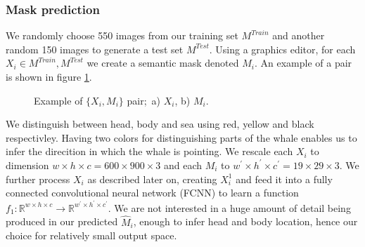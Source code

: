 \documentclass{IET}%
\newcommand{\real}{\mathbb{R}}
\begin{document}
\subsubsection{Mask prediction}

We randomly choose 550 images from our training set $M^{Train}$ and another random 150 images to generate a test set $M^{Test}$. Using a graphics editor, for each $X_i \in {M^{Train}, M^{Test}}$ we create a semantic mask denoted $M_i$. An example of a pair is shown in figure \ref{fig:whaleLabel}.
\begin{figure}[H]
\centering     %
{}
\caption{Example of $\{X_i,M_i\}$ pair;\
a) $X_i$, b) $M_i$.
}\label{fig:whaleLabel}
\end{figure}
We distinguish between head, body and sea using red, yellow and black respectivley. Having two colors for distinguishing parts of the whale enables us to infer the direcition in which the whale is pointing. We rescale each $X_i$ to dimension $w \times h \times c = 600 \times 900 \times 3$ and each $M_i$ to $w^{'}\times h^{'}\times c^{'} = 19 \times 29 \times 3$. We further process $X_i$ as described later on, creating $X_i^1$ and feed it into a fully connected convolutional neural network (FCNN) to learn a function $f_1: \real^{w\times h \times c} \to \real^{w^{'}\times h^{'}\times c^{'}}$. We are not interested in a huge amount of detail being produced in our predicted $\hat{M}_i$, enough to infer head and body location, hence our choice for relatively small output space.
\end{document}
